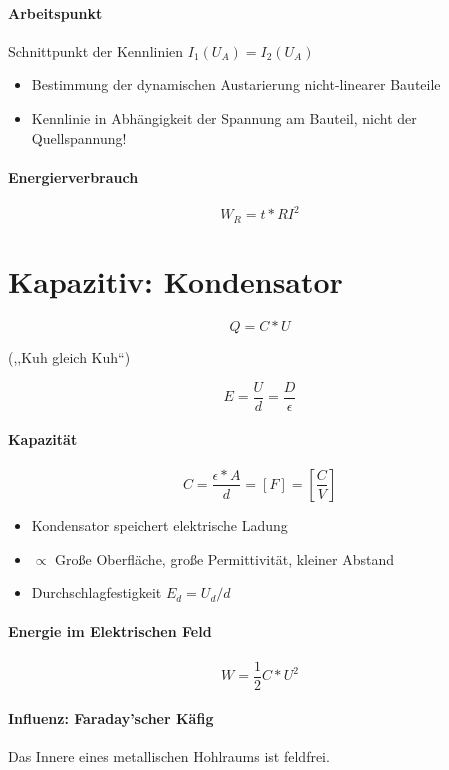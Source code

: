 \paragraph{Arbeitspunkt} Schnittpunkt der Kennlinien $I_1 (U_A) = I_2 (U_A)$

\begin{itemize}
  \item Bestimmung der dynamischen Austarierung nicht-linearer Bauteile
  \item Kennlinie in Abhängigkeit der Spannung am Bauteil, nicht der Quellspannung!
\end{itemize}

\paragraph{Energierverbrauch}

$$W_R = t * RI^2$$

\section{Kapazitiv: Kondensator}


$$Q = C * U$$

(,,Kuh gleich Kuh``)

$$E = \frac{U}{d} = \frac{D}{\epsilon}$$

\paragraph{Kapazität}

$$C = \frac{\epsilon * A}{d} = [F] = \left[\frac{C}{V}\right]$$

\begin{itemize}
  \item Kondensator speichert elektrische Ladung
  \item $\propto$ Gro\ss e Oberfläche, gro\ss e Permittivität, kleiner Abstand
  \item Durchschlagfestigkeit $E_d = U_d / d$
\end{itemize}

\paragraph{Energie im Elektrischen Feld}

$$W = \frac{1}{2} C * U^2$$

\paragraph{Influenz: Faraday'scher Käfig}
Das Innere eines metallischen Hohlraums ist feldfrei.

